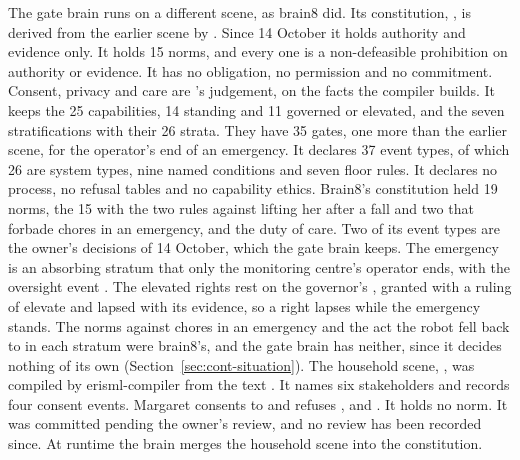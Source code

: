 The gate brain runs on a different scene, as brain8 did. Its constitution,
, is derived from the earlier scene by
. Since 14 October it holds authority and evidence
only. It holds 15 norms, and every one is a non-defeasible prohibition on authority or evidence.
It has no obligation, no permission and no commitment. Consent, privacy and care are \deme{}'s
judgement, on the facts the compiler builds. It keeps the 25 capabilities, 14 standing and 11 governed or
elevated, and the seven stratifications with their 26 strata. They have 35 gates, one more than
the earlier scene, for the operator's end of an emergency. It declares 37 event types, of which 26
are system types, nine named conditions and seven floor rules. It declares no process, no refusal
tables and no capability ethics. Brain8's constitution held 19 norms, the 15 with the two rules
against lifting her after a fall and two that forbade chores in an emergency, and the duty of care.
Two of its event types are the owner's decisions of 14 October, which the gate brain keeps. The
emergency is an absorbing stratum that only the monitoring centre's operator ends, with the
oversight event . The elevated rights rest on the governor's
, granted with a ruling of elevate and lapsed with its evidence, so a right lapses
while the emergency stands. The norms against chores in an emergency and the act the robot fell
back to in each stratum were brain8's, and the gate brain has neither, since it decides nothing of
its own (Section~\ref{sec:cont-situation}).
The household scene, , was compiled by erisml-compiler from the
text . It names six stakeholders and records four consent events.
Margaret consents to  and refuses ,
 and . It holds no norm. It was committed pending the
owner's review, and no review has been recorded since. At runtime the brain merges the household
scene into the constitution.

